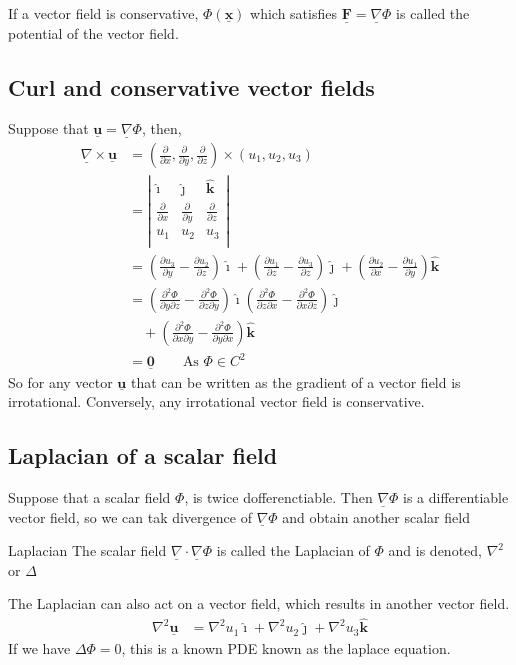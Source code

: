 \documentclass{article}
\renewcommand{\vec}[1]{\underline{\textbf{#1}}}
\newcommand{\veci}{\bm{\hat{\imath}}}
\newcommand{\vecj}{\bm{\hat{\jmath}}}
\newcommand{\veck}{\bm{\hat{k}}}
\newcommand{\p}{\Phi}
\newcommand{\pa}{\partial}
\newcommand{\nab}{\underline{\nabla}}
\newcommand{\pd}[2]{\frac{\partial #1}{\partial #2}}
\renewcommand{\div}{\nab \cdot}
\newcommand{\curl}{\nab \times}
\begin{document}
If a vector field is conservative, $\p(\vec x)$ which satisfies $\vec F = \nab \p$ is called the potential of the vector field.

\subsection{Curl and conservative vector fields}
Suppose that $\displaystyle{\vec u = \nab\p}$, then,
\begin{align*}
  \curl\vec u &= \left( \pd{}{x}, \pd{}{y}, \pd{}{z}\right)\times (u_1, u_2, u_3)\\
  &= \left|\begin{matrix}
    \veci & \vecj & \veck \\
    \pd{}{x} & \pd{}{y} & \pd{}{z} \\
    u_1 & u_2 & u_3 \\
  \end{matrix}\right|\\
  &= \left( \pd{u_3}{y} - \pd{u_2}{z} \right)\veci + \left(\pd{u_1}{z} - \pd{u_3}{z}\right)\vecj + \left(\pd{u_2}{x} - \pd{u_1}{y} \right)\veck\\
  &= \left(\pd{^2\p}{y\pa z}- \pd{^2\p}{z\pa y} \right)\veci \left(\pd{^2\p}{z\pa x} - \pd{^2\p}{x\pa z} \right)\vecj \\
  &\quad+ \left(\pd{^2\p}{x \pa y} - \pd{^2\p}{y\pa x}\right)\veck\\
  &= \vec 0 \qquad\text{As $\p \in C^2$}
\end{align*}
So for any vector $\vec u$ that can be written as the gradient of a vector field is irrotational. Conversely, any irrotational vector field is conservative.

\subsection{Laplacian of a scalar field}
 Suppose that a scalar field $\p$, is twice dofferenctiable. Then $\nab\p$ is a differentiable vector field, so we can tak divergence of $\nab\p$ and obtain another scalar field\\
\noindent\begin{definition}{Laplacian}{}
 The scalar field $\div\nab\p$ is called the Laplacian of $\p$ and is denoted, $\nabla^2$ or $\Delta$
\end{definition}\vspace{10pt}

The Laplacian can also act on a vector field, which results in another vector field.
\begin{align*}
  \nabla^2\vec u &= {\nabla^2 u}_1 \veci + {\nabla^2 u}_2 \vecj + {\nabla^2 u}_3 \veck
\end{align*}
If we have $\Delta \p = 0$, this is a known PDE known as the laplace equation.
\end{document}
